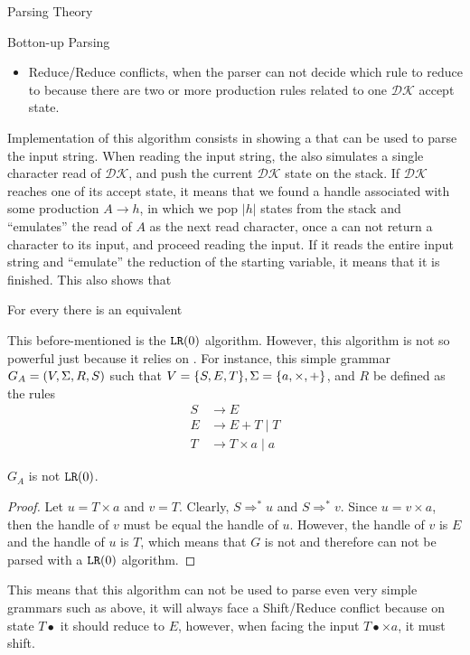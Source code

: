 \begin{section}{Parsing Theory}
\begin{subsection}{Botton-up Parsing}
\begin{itemize}
	\item Reduce/Reduce conflicts, when the parser can not decide which
	rule to reduce to because there are two or more production rules
	related to one $\mathcal{DK}$ accept state.
\end{itemize}

Implementation of this algorithm consists in showing a \DPDA that
can be used to parse the input string. When reading the input string,
the \DPDA also simulates a single character read of $\mathcal{DK}$,
and push the current $\mathcal{DK}$ state on the stack. If
$\mathcal{DK}$ reaches one of its accept state, it means that we
found a handle associated with some production $A \rightarrow h$,
in which we pop $|h|$ states from the \DPDA stack and ``emulates''
the read of $A$ as the next read character, once a \DPDA can
not return a character to its input, and proceed reading the input.
If it reads the entire input string and ``emulate'' the reduction
of the starting variable, it means that it is finished. This also
shows that
\begin{lemma}
For every \DCFG there is an equivalent \DPDA
\end{lemma}

This before-mentioned \DPDA is the $\texttt{LR}(0)$ algorithm.
However, this algorithm is not so powerful just because it relies on
\DCFG. For instance, this simple grammar $G_A = (V, \Sigma, R, S)$ such that
$V = \{S, E, T\}, \Sigma = \{a, \times, +\}$, and $R$ be defined as the rules
\begin{align}
S &\rightarrow E \nonumber \\
E &\rightarrow E + T \; | \; T \nonumber \\
T &\rightarrow T \times a \; | \; a \nonumber
\end{align}

\begin{lemma}\label{shift_reduce}
	$G_A$ is not $\texttt{LR}(0)$.
\end{lemma}
\begin{proof}
	Let $u = T \times a$ and $v = T$. Clearly, $S \Rightarrow^* u$ and
	$S \Rightarrow^*v$. Since $u = v \times a$, then the handle of
	$v$ must be equal the handle of $u$. However, the handle of $v$
	is $E$ and the handle of $u$ is $T$, which means that $G$ is not
	 and therefore can not be parsed with a $\texttt{LR}(0)$
	algorithm.
\end{proof}

This means that this algorithm can not be used to parse even very simple
grammars such as above, it will always face a Shift/Reduce conflict
because on state $T\bullet$ it should reduce to $E$, however, when
facing the input $T\bullet \times a$, it must shift.


\end{subsection}
\end{section}

